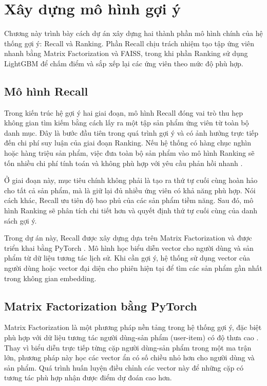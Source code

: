 ﻿\chapter{Xây dựng mô hình gợi ý}

Chương này trình bày cách dự án xây dựng hai thành phần mô hình chính của hệ thống gợi ý: Recall và Ranking. Phần Recall chịu trách nhiệm tạo tập ứng viên nhanh bằng Matrix Factorization và FAISS, trong khi phần Ranking sử dụng LightGBM để chấm điểm và sắp xếp lại các ứng viên theo mức độ phù hợp.

\section{Mô hình Recall}
Trong kiến trúc hệ gợi ý hai giai đoạn, mô hình Recall đóng vai trò thu hẹp không gian tìm kiếm bằng cách lấy ra một tập sản phẩm ứng viên từ toàn bộ danh mục. Đây là bước đầu tiên trong quá trình gợi ý và có ảnh hưởng trực tiếp đến chi phí suy luận của giai đoạn Ranking. Nếu hệ thống có hàng chục nghìn hoặc hàng triệu sản phẩm, việc đưa toàn bộ sản phẩm vào mô hình Ranking sẽ tốn nhiều chi phí tính toán và không phù hợp với yêu cầu phản hồi nhanh \cite{covington2016deep}.
\medskip

Ở giai đoạn này, mục tiêu chính không phải là tạo ra thứ tự cuối cùng hoàn hảo cho tất cả sản phẩm, mà là giữ lại đủ nhiều ứng viên có khả năng phù hợp. Nói cách khác, Recall ưu tiên độ bao phủ của các sản phẩm tiềm năng. Sau đó, mô hình Ranking sẽ phân tích chi tiết hơn và quyết định thứ tự cuối cùng của danh sách gợi ý.
\medskip

Trong dự án này, Recall được xây dựng dựa trên Matrix Factorization \cite{koren2009matrix} và được triển khai bằng PyTorch \cite{paszke2019pytorch}. Mô hình học biểu diễn vector cho người dùng và sản phẩm từ dữ liệu tương tác lịch sử. Khi cần gợi ý, hệ thống sử dụng vector của người dùng hoặc vector đại diện cho phiên hiện tại để tìm các sản phẩm gần nhất trong không gian embedding.

\section{Matrix Factorization bằng PyTorch}
Matrix Factorization là một phương pháp nền tảng trong hệ thống gợi ý, đặc biệt phù hợp với dữ liệu tương tác người dùng-sản phẩm (user-item) có độ thưa cao \cite{koren2009matrix}. Thay vì biểu diễn trực tiếp từng cặp người dùng-sản phẩm trong một ma trận lớn, phương pháp này học các vector ẩn có số chiều nhỏ hơn cho người dùng và sản phẩm. Quá trình huấn luyện điều chỉnh các vector này để những cặp có tương tác phù hợp nhận được điểm dự đoán cao hơn.
\medskip

